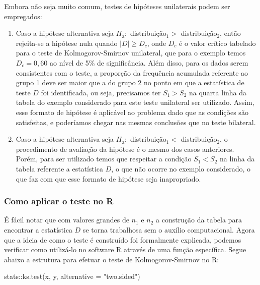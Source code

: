 \documentclass[
  letterpaper,
  DIV=11,
  numbers=noendperiod]{scrreprt}
\newenvironment{Shaded}{\begin{snugshade}}{\end{snugshade}}
\newcommand{\AttributeTok}[1]{\textcolor[rgb]{0.40,0.45,0.13}{#1}}
\newcommand{\FunctionTok}[1]{\textcolor[rgb]{0.28,0.35,0.67}{#1}}
\newcommand{\NormalTok}[1]{\textcolor[rgb]{0.00,0.23,0.31}{#1}}
\newcommand{\SpecialCharTok}[1]{\textcolor[rgb]{0.37,0.37,0.37}{#1}}
\newcommand{\StringTok}[1]{\textcolor[rgb]{0.13,0.47,0.30}{#1}}
\begin{document}
Embora não seja muito comum, testes de hipóteses unilaterais podem ser
empregados:

\begin{enumerate}
\def\labelenumi{\arabic{enumi})}
\item
  Caso a hipótese alternativa seja \(H_{\mathrm{a}}:\)
  distribuição\(_1 >\) distribuição\({ }_2\), então rejeita-se a
  hipótese nula quando \(|D| \geq D_c\), onde \(D_c\) é o valor crítico
  tabelado para o teste de Kolmogorov-Smirnov unilateral, que para o
  exemplo temos \(D_c = 0,60\) ao nível de 5\% de significância. Além
  disso, para os dados serem consistentes com o teste, a proporção da
  frequência acumulada referente ao grupo 1 deve ser maior que a do
  grupo 2 no ponto em que a estatística de teste \(D\) foi identificada,
  ou seja, precisamos ter \(S_1 > S_2\) na quarta linha da tabela do
  exemplo considerado para este teste unilateral ser utilizado. Assim,
  esse formato de hipótese é aplicável ao problema dado que as condições
  são satisfeitas, e poderíamos chegar nas mesmas conclusões que no
  teste bilateral.
\item
  Caso a hipótese alternativa seja \(H_{\mathrm{a}}:\)
  distribuição\(_1 <\) distribuição\({ }_2\), o procedimento de
  avaliação da hipótese é o mesmo dos casos anteriores. Porém, para ser
  utilizado temos que respeitar a condição \(S_1 < S_2\) na linha da
  tabela referente a estatística \(D\), o que não ocorre no exemplo
  considerado, o que faz com que esse formato de hipótese seja
  inapropriado.
\end{enumerate}

\hypertarget{como-aplicar-o-teste-no-r-1}{%
\subsubsection{Como aplicar o teste no
R}\label{como-aplicar-o-teste-no-r-1}}

É fácil notar que com valores grandes de \(n_1\) e \(n_2\) a construção
da tabela para encontrar a estatística \(D\) se torna trabalhosa sem o
auxílio computacional. Agora que a ideia de como o teste é construído
foi formalmente explicada, podemos verificar como utilizá-lo no software
R através de uma função específica. Segue abaixo a estrutura para
efetuar o teste de Kolmogorov-Smirnov no R:

\begin{Shaded}
\begin{Highlighting}[]
\NormalTok{stats}\SpecialCharTok{::}\FunctionTok{ks.test}\NormalTok{(x, y, }\AttributeTok{alternative =} \StringTok{"two.sided"}\NormalTok{)}
\end{Highlighting}
\end{Shaded}
\end{document}
